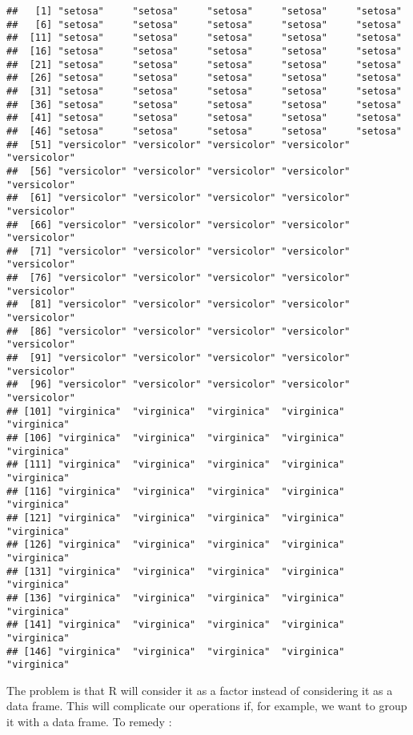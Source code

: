 \documentclass[
]{article}
\begin{document}
\begin{verbatim}
##   [1] "setosa"     "setosa"     "setosa"     "setosa"     "setosa"    
##   [6] "setosa"     "setosa"     "setosa"     "setosa"     "setosa"    
##  [11] "setosa"     "setosa"     "setosa"     "setosa"     "setosa"    
##  [16] "setosa"     "setosa"     "setosa"     "setosa"     "setosa"    
##  [21] "setosa"     "setosa"     "setosa"     "setosa"     "setosa"    
##  [26] "setosa"     "setosa"     "setosa"     "setosa"     "setosa"    
##  [31] "setosa"     "setosa"     "setosa"     "setosa"     "setosa"    
##  [36] "setosa"     "setosa"     "setosa"     "setosa"     "setosa"    
##  [41] "setosa"     "setosa"     "setosa"     "setosa"     "setosa"    
##  [46] "setosa"     "setosa"     "setosa"     "setosa"     "setosa"    
##  [51] "versicolor" "versicolor" "versicolor" "versicolor" "versicolor"
##  [56] "versicolor" "versicolor" "versicolor" "versicolor" "versicolor"
##  [61] "versicolor" "versicolor" "versicolor" "versicolor" "versicolor"
##  [66] "versicolor" "versicolor" "versicolor" "versicolor" "versicolor"
##  [71] "versicolor" "versicolor" "versicolor" "versicolor" "versicolor"
##  [76] "versicolor" "versicolor" "versicolor" "versicolor" "versicolor"
##  [81] "versicolor" "versicolor" "versicolor" "versicolor" "versicolor"
##  [86] "versicolor" "versicolor" "versicolor" "versicolor" "versicolor"
##  [91] "versicolor" "versicolor" "versicolor" "versicolor" "versicolor"
##  [96] "versicolor" "versicolor" "versicolor" "versicolor" "versicolor"
## [101] "virginica"  "virginica"  "virginica"  "virginica"  "virginica" 
## [106] "virginica"  "virginica"  "virginica"  "virginica"  "virginica" 
## [111] "virginica"  "virginica"  "virginica"  "virginica"  "virginica" 
## [116] "virginica"  "virginica"  "virginica"  "virginica"  "virginica" 
## [121] "virginica"  "virginica"  "virginica"  "virginica"  "virginica" 
## [126] "virginica"  "virginica"  "virginica"  "virginica"  "virginica" 
## [131] "virginica"  "virginica"  "virginica"  "virginica"  "virginica" 
## [136] "virginica"  "virginica"  "virginica"  "virginica"  "virginica" 
## [141] "virginica"  "virginica"  "virginica"  "virginica"  "virginica" 
## [146] "virginica"  "virginica"  "virginica"  "virginica"  "virginica"
\end{verbatim}

The problem is that R will consider it as a factor instead of
considering it as a data frame. This will complicate our operations if,
for example, we want to group it with a data frame. To remedy :
\end{document}

